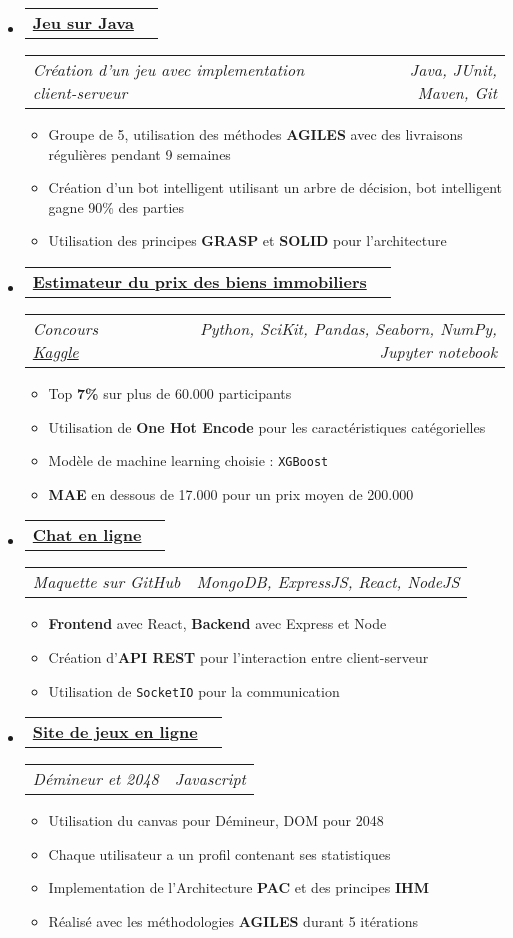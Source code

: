 \documentclass[letterpaper,11pt]{article}
\makeatletter
\newcommand{\resitem}[1]{\item #1 \vspace{-2pt}}
\newcommand{\resheading}[1]{{\large \parashade[.9]{sharpcorners}{\textbf{#1 \vphantom{p\^{E}}}}}}
\newcommand{\ressubheadinga}[2]{
\begin{tabular*}{7.11in}{l@{\extracolsep{\fill}}r}
		\textbf{#1} & #2 \\
\end{tabular*}}
\newcommand{\ressubheadingb}[2]{
\begin{tabular*}{7.11in}{l@{\extracolsep{\fill}}r}
		\textit{#1} & \textit{#2} \\
\end{tabular*}\vspace{-6pt}}
\makeatother
\begin{document}
\vspace{-0.16in}
\resheading{Projets Personnels}
\vspace{-0.235in}
\begin{itemize}
\item
	\ressubheadinga{\href{https://github.com/aryamaan3/Batisseurs}{Jeu sur Java}}{}
	\ressubheadingb{Création d'un jeu avec implementation client-serveur}{Java, JUnit, Maven, Git}
	\vspace{-0.15in}
	\begin{itemize}
		\resitem{Groupe de 5, utilisation des méthodes \textbf{AGILES} avec des livraisons régulières pendant 9 semaines}
		\resitem{Création d'un bot intelligent utilisant un arbre de décision, bot intelligent gagne 90\% des parties}
		\resitem{Utilisation des principes \textbf{GRASP} et \textbf{SOLID} pour l'architecture}
		
	\end{itemize}
	
\item	
	\ressubheadinga{\href{https://github.com/aryamaan3/Kaggle-Data-Science/tree/master/House\%20Price\%20Estimation}{Estimateur du prix des biens immobiliers}}{}
	\ressubheadingb{Concours {\href{https://www.kaggle.com/aryamaankunwar/competitions}{Kaggle}}}{Python, SciKit, Pandas, Seaborn, NumPy, Jupyter notebook}
	\vspace{-0.15in}
	\begin{itemize}
		\resitem{Top \textbf{7\%} sur plus de 60.000 participants}
		\resitem{Utilisation de \textbf{One Hot Encode} pour les caractéristiques catégorielles}
		\resitem{Modèle de machine learning choisie : \texttt{XGBoost}}
		\resitem{\textbf{MAE} en dessous de 17.000 pour un prix moyen de 200.000}
	\end{itemize}
	
\item	
	\ressubheadinga{\href{https://github.com/aryamaan3/chat-app}{Chat en ligne}}{}
	\ressubheadingb{Maquette sur GitHub}{\textit{MongoDB, ExpressJS, React, NodeJS}}
	\vspace{-0.25in}
	\begin{itemize}
		\resitem{\textbf{Frontend} avec React, \textbf{Backend} avec Express et Node}
		\resitem{Création d'\textbf{API REST} pour l'interaction entre client-serveur}
		\resitem{Utilisation de {\texttt{SocketIO}} pour la communication}
	\end{itemize}
	
\item	
	\ressubheadinga{\href{https://github.com/aryamaan3/Site-de-jeux-en-ligne}{Site de jeux en ligne}}{}
	\ressubheadingb{Démineur et 2048}{Javascript}
	\vspace{-0.15in}
	\begin{itemize}
		\resitem{Utilisation du canvas pour Démineur, DOM pour 2048}
		\resitem{Chaque utilisateur a un profil contenant ses statistiques}
		\resitem{Implementation de l'Architecture \textbf{PAC} et des principes \textbf{IHM}}
		\resitem{Réalisé avec les méthodologies \textbf{AGILES} durant 5 itérations}
	\end{itemize}
	
\end{itemize}
\end{document}
